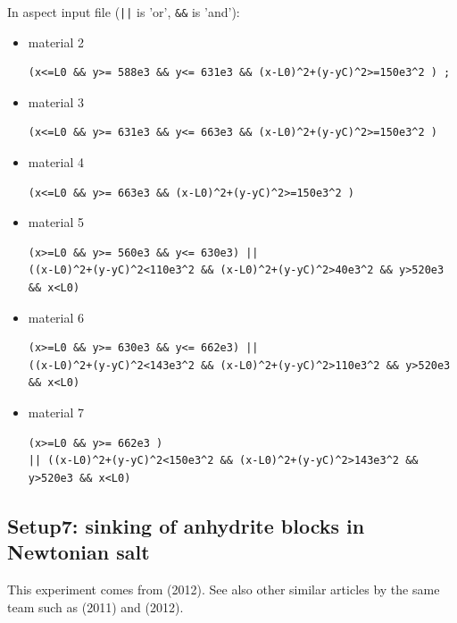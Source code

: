 In aspect input file ({\tt ||} is 'or', {\tt \&\&}  is 'and'):
\begin{itemize}
\item material 2
\begin{verbatim}
(x<=L0 && y>= 588e3 && y<= 631e3 && (x-L0)^2+(y-yC)^2>=150e3^2 ) ; 
\end{verbatim}
\item material 3
\begin{verbatim}
(x<=L0 && y>= 631e3 && y<= 663e3 && (x-L0)^2+(y-yC)^2>=150e3^2 ) 
\end{verbatim}
\item material 4
\begin{verbatim}
(x<=L0 && y>= 663e3 && (x-L0)^2+(y-yC)^2>=150e3^2 )
\end{verbatim}
\item material 5
\begin{verbatim}
(x>=L0 && y>= 560e3 && y<= 630e3) || 
((x-L0)^2+(y-yC)^2<110e3^2 && (x-L0)^2+(y-yC)^2>40e3^2 && y>520e3 && x<L0) 
\end{verbatim}
\item material 6
\begin{verbatim}
(x>=L0 && y>= 630e3 && y<= 662e3) || 
((x-L0)^2+(y-yC)^2<143e3^2 && (x-L0)^2+(y-yC)^2>110e3^2 && y>520e3 && x<L0) 
\end{verbatim}
\item material 7
\begin{verbatim}
(x>=L0 && y>= 662e3 )  
|| ((x-L0)^2+(y-yC)^2<150e3^2 && (x-L0)^2+(y-yC)^2>143e3^2 && y>520e3 && x<L0) 
\end{verbatim}
\end{itemize}

\subsection*{Setup7: sinking of anhydrite blocks in Newtonian salt}

This experiment comes from \textcite{buks12} (2012). 
See also other similar articles by the same team such as 
\textcite{buks11} (2011) and \textcite{buks12b} (2012).

